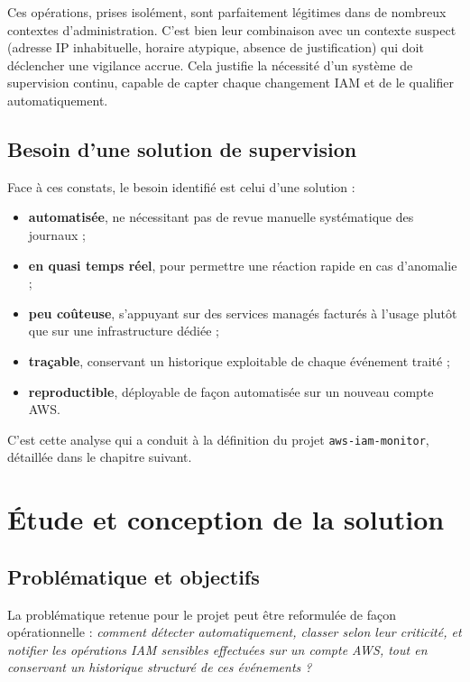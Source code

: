 \documentclass[11pt,a4paper]{report}
\begin{document}
Ces opérations, prises isolément, sont parfaitement légitimes dans de nombreux contextes d'administration. C'est bien leur combinaison avec un contexte suspect (adresse IP inhabituelle, horaire atypique, absence de justification) qui doit déclencher une vigilance accrue. Cela justifie la nécessité d'un système de supervision continu, capable de capter chaque changement IAM et de le qualifier automatiquement.

\section{Besoin d'une solution de supervision}

Face à ces constats, le besoin identifié est celui d'une solution :

\begin{itemize}[leftmargin=1.4em]
  \item \textbf{automatisée}, ne nécessitant pas de revue manuelle systématique des journaux ;
  \item \textbf{en quasi temps réel}, pour permettre une réaction rapide en cas d'anomalie ;
  \item \textbf{peu coûteuse}, s'appuyant sur des services managés facturés à l'usage plutôt que sur une infrastructure dédiée ;
  \item \textbf{traçable}, conservant un historique exploitable de chaque événement traité ;
  \item \textbf{reproductible}, déployable de façon automatisée sur un nouveau compte AWS.
\end{itemize}

C'est cette analyse qui a conduit à la définition du projet \texttt{aws-iam-monitor}, détaillée dans le chapitre suivant.

\chapter{Étude et conception de la solution}

\section{Problématique et objectifs}

La problématique retenue pour le projet peut être reformulée de façon opérationnelle : \textit{comment détecter automatiquement, classer selon leur criticité, et notifier les opérations IAM sensibles effectuées sur un compte AWS, tout en conservant un historique structuré de ces événements ?}
\end{document}
